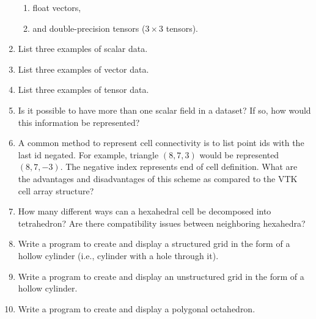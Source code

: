 \begin{enumerate}
\begin{enumerate}
	\item float vectors,

	\item and double-precision tensors ($3 \times 3$ tensors).

\end{enumerate}

\item List three examples of scalar data.

\item List three examples of vector data.

\item List three examples of tensor data.

\item Is it possible to have more than one scalar field in a dataset? If so, how would this information be represented?

\item  A common method to represent cell connectivity is to list point ids with the last id negated. For example, triangle $(8,7,3)$ would be represented $(8,7,-3)$. The negative index represents end of cell definition. What are the advantages and disadvantages of this scheme as compared to the VTK cell array structure?

\item  How many different ways can a hexahedral cell be decomposed into tetrahedron? Are there compatibility issues between neighboring hexahedra?

\item Write a program to create and display a structured grid in the form of a hollow cylinder (i.e., cylinder with a hole through it).

\item Write a program to create and display an unstructured grid in the form of a hollow cylinder.

\item Write a program to create and display a polygonal octahedron.

\end{enumerate}

